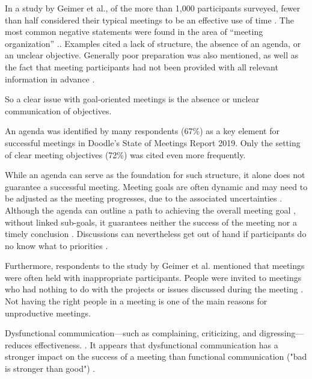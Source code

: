 In a study by Geimer et al., of the more than 1,000 participants surveyed, fewer than half
considered their typical meetings to be an effective use of time \cite[p. 2019]{geimerMeetingsWorkPerceived2015}.  The
most common negative statements were found in the area of “meeting organization” \cite[p.
2019]{geimerMeetingsWorkPerceived2015}.. Examples cited a lack of structure, the absence
of an agenda, or an unclear objective. Generally poor preparation was also mentioned, as well as the fact that
meeting participants had not been provided with all relevant information in advance \cite[p.
2019f]{geimerMeetingsWorkPerceived2015}.

So a clear issue with goal-oriented meetings is the absence or unclear communication of objectives.

An agenda was identified by many respondents (67\%) as a key element for successful meetings in Doodle’s State
of Meetings Report 2019. Only the setting of clear meeting objectives (72\%) was cited even more frequently.
\cite[p. 11]{DoodleStateMeetings2019}

While an agenda can serve as the foundation for such structure, it alone does not guarantee a successful
meeting. Meeting goals are often dynamic and may need to be adjusted as the meeting progresses, due to the associated
uncertainties \cite[chap 4.1]{chenAreWeTrack2025}. Although the agenda can outline a path to achieving the
overall meeting goal \cite[chap 2.1]{scottMentalModelsMeeting2024}, without linked sub-goals, it guarantees
neither the success of the meeting nor a timely conclusion \cite[chap 4.1]{chenAreWeTrack2025}.
Discussions can nevertheless get out of hand if participants do no know what to priorities \cite[chap
4.1]{chenAreWeTrack2025}.

Furthermore, respondents to the study by Geimer et al. mentioned that meetings were often held with
inappropriate participants. People were invited to meetings who had nothing to do with the projects or issues
discussed during the meeting \cite[p. 2019f]{geimerMeetingsWorkPerceived2015}.
Not having the right people in a meeting is one of the main reasons for unproductive meetings.
\cite[p.6]{romanoMeetingAnalysisFindings2001}

Dysfunctional communication—such as complaining, criticizing, and digressing—reduces effectiveness.
\cite[p. 130]{kauffeldMeetingsMatterEffects2012}. It appears that dysfunctional communication has a stronger
impact on the success of a meeting than functional communication ("bad is stronger than good") \cite[p.
148]{kauffeldMeetingsMatterEffects2012}.

